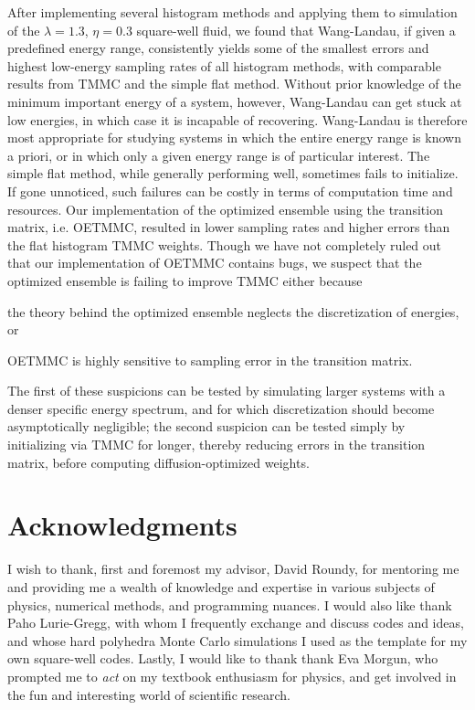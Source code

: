 \documentclass[11pt]{article}
\begin{document}
After implementing several histogram methods and applying them to
simulation of the $\lambda=1.3$, $\eta=0.3$ square-well fluid, we
found that Wang-Landau, if given a predefined energy range,
consistently yields some of the smallest errors and highest low-energy
sampling rates of all histogram methods, with comparable results from
TMMC and the simple flat method. Without prior knowledge of the
minimum important energy of a system, however, Wang-Landau can get
stuck at low energies, in which case it is incapable of
recovering. Wang-Landau is therefore most appropriate for studying
systems in which the entire energy range is known a priori, or in
which only a given energy range is of particular interest. The simple
flat method, while generally performing well, sometimes fails to
initialize. If gone unnoticed, such failures can be costly in terms of
computation time and resources. Our implementation of the optimized
ensemble using the transition matrix, i.e. OETMMC, resulted in lower
sampling rates and higher errors than the flat histogram TMMC
weights. Though we have not completely ruled out that our
implementation of OETMMC contains bugs, we suspect that the optimized
ensemble is failing to improve TMMC either because
\begin{enumerate*}[label=\roman*)]
\item the theory behind the optimized ensemble neglects the
  discretization of energies, or
\item OETMMC is highly sensitive to sampling error in the transition
  matrix.
\end{enumerate*}
The first of these suspicions can be tested by simulating larger
systems with a denser specific energy spectrum, and for which
discretization should become asymptotically negligible; the second
suspicion can be tested simply by initializing via TMMC for longer,
thereby reducing errors in the transition matrix, before computing
diffusion-optimized weights.


\section{Acknowledgments}
\label{sec:acknowledgements}

I wish to thank, first and foremost my advisor, David Roundy, for
mentoring me and providing me a wealth of knowledge and expertise in
various subjects of physics, numerical methods, and programming
nuances. I would also like thank Paho Lurie-Gregg, with whom I
frequently exchange and discuss codes and ideas, and whose hard
polyhedra Monte Carlo simulations I used as the template for my own
square-well codes. Lastly, I would like to thank thank Eva Morgun, who
prompted me to {\it act} on my textbook enthusiasm for physics, and
get involved in the fun and interesting world of scientific
research.


\nocite{apsrev41Control}  \lhead{}
\end{document}
